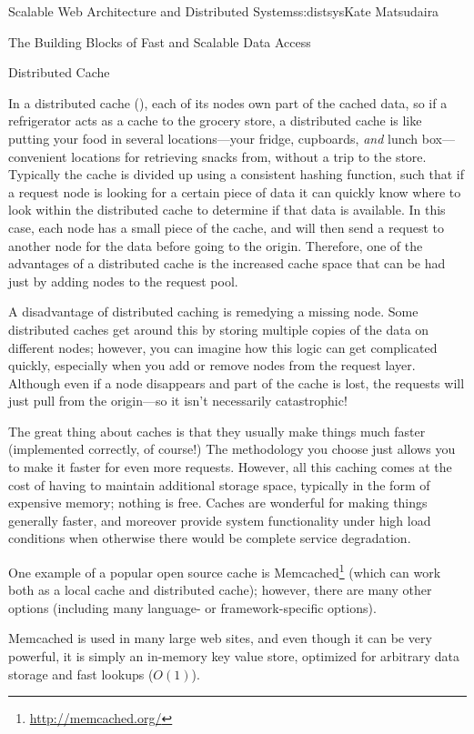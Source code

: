 \begin{aosachapter}{Scalable Web Architecture and Distributed Systems}{s:distsys}{Kate Matsudaira}
\begin{aosasect1}{The Building Blocks of Fast and Scalable Data Access}
\begin{aosasect2}{Distributed Cache}

In a distributed cache (), each of its nodes 
own part of the cached data,
so if a refrigerator acts as a cache to the grocery store, a
distributed cache is like putting your food in several locations---your
fridge, cupboards, \emph{and} lunch box---convenient locations for
retrieving snacks from, without a trip to the store. Typically the cache is divided up
using a consistent hashing function, such that if a request node is
looking for a certain piece of data it can quickly know where to look
within the distributed cache to determine if that data is
available. In this case, each node has a small piece of the cache, and
will then send a request to another node for the data before going to
the origin. Therefore, one of the advantages of a distributed cache is
the increased cache space that can be had just by adding 
nodes to the request pool.


A disadvantage of distributed caching is remedying a missing
node. Some distributed caches get around this by storing multiple
copies of the data on different nodes; however, you can imagine how
this logic can get complicated quickly, especially when you add or
remove nodes from the request layer. Although even if a node
disappears and part of the cache is lost, the requests will just pull
from the origin---so it isn't necessarily catastrophic!

The great thing about caches is that they usually make things much
faster (implemented correctly, of course!) The methodology you choose
just allows you to make it faster for even more requests. However, all
this caching comes at the cost of having to maintain additional
storage space, typically in the form of expensive memory; nothing is
free. Caches are wonderful for making things generally faster, and
moreover provide system functionality under high load conditions when
otherwise there would be complete service degradation.

One example of a popular open source cache is
Memcached\footnote{\url{http://memcached.org/}} (which can work both
as a local cache and distributed cache); however, there are many other
options (including many language- or framework-specific options).

Memcached is used in many large web sites, and even though it can be
very powerful, it is simply an in-memory key value store, optimized
for arbitrary data storage and fast lookups ($O(1)$).


\end{aosasect2}
\end{aosasect1}
\end{aosachapter}
